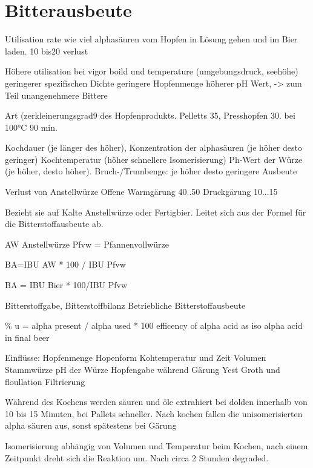 \documentclass[a4paper,parskip=half]{scrartcl}
\begin{document}
\section*{Bitterausbeute}

\parencite[50]{Holle2010}
Utilisation rate wie viel alphasäuren vom Hopfen in Lösung gehen
und im Bier laden. 10 bis20 verlust

Höhere utilisation bei
vigor boild und temperature (umgebungsdruck, seehöhe)
geringerer spezifischen Dichte
geringere Hopfenmenge
höherer pH Wert, -> zum Teil unangenehmere Bittere

\parencite[159]{Annemueller2015}

Art (zerkleinerungsgrad9 des Hopfenprodukts. Pelletts 35, Presshopfen
30. bei 100°C 90 min.

Kochdauer (je länger des höher), Konzentration der alphasäuren (je höher desto geringer)
Kochtemperatur (höher schnellere Isomerisierung)
Ph-Wert der Würze (je höher, desto höher).
Bruch-/Trumbenge: je höher desto geringere Ausbeute 

\parencite[160]{Annemueller2015}
Verlust von Anstellwürze
Offene Warmgärung 40..50
Druckgärung 10...15

\parencite[162\psq]{Annemueller2015}
Bezieht sie auf Kalte Anstellwürze oder Fertigbier. Leitet sich aus der
Formel für die Bitterstoffausbeute ab. 

AW Anstellwürze
Pfvw = Pfannenvollwürze

BA=IBU AW * 100 / IBU Pfvw

BA = IBU Bier * 100/IBU Pfvw

\parencite[160-164]{Annemueller2015}
Bitterstoffgabe, Bitterstoffbilanz
Betriebliche Bitterstoffausbeute

\parencite[124]{Garetz1994} 

\% u = alpha present / alpha used * 100
efficency of alpha acid as iso alpha acid in final beer

Einflüsse:
Hopfenmenge
Hopenform
Kohtemperatur und Zeit
Volumen
Stammwürze
pH der Würze
Hopfengabe während Gärung
Yest Groth und floullation
Filtrierung

\parencite[125]{Garetz1994} 
Während des Kochens werden säuren und öle extrahiert 
bei dolden innerhalb von 10 bis 15 Minuten, bei Pallets
schneller.
Nach kochen fallen die unisomerisierten alpha säuren
aus, sonst spätestens bei Gärung

Isomerisierung abhängig von Volumen und Temperatur beim
Kochen, nach einem Zeitpunkt dreht sich die Reaktion
um. Nach circa 2 Stunden degraded. 
\end{document}

